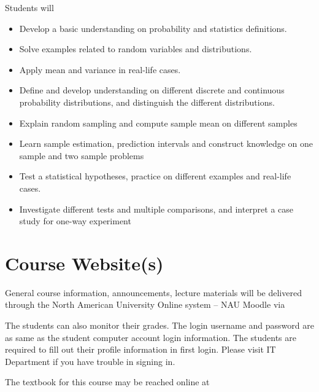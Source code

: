 \documentclass[handout]{ximera}
\begin{document}
Students will
\begin{itemize}
\item Develop a basic understanding on probability and statistics definitions.

\item Solve examples related to random variables and distributions.

\item Apply mean and variance in real-life cases.

\item Define and develop understanding on different discrete and continuous probability distributions, and distinguish the different distributions.

\item Explain random sampling and compute sample mean on different samples

\item Learn sample estimation, prediction intervals and construct knowledge on one sample and two sample problems

\item Test a statistical hypotheses, practice on different examples and real-life cases.

\item Investigate different tests and multiple comparisons, and interpret a case study for one-way experiment
\end{itemize}

\section*{Course Website(s)}

General course information, announcements, lecture materials will be delivered through the North American University Online system -- NAU Moodle via 


The students can also monitor their grades. The login username and password are as same as the student computer account login information. The students are required to fill out their profile information in first login. Please visit IT Department if you have trouble in signing in.

The textbook for this course may be reached online at 

\end{document}

